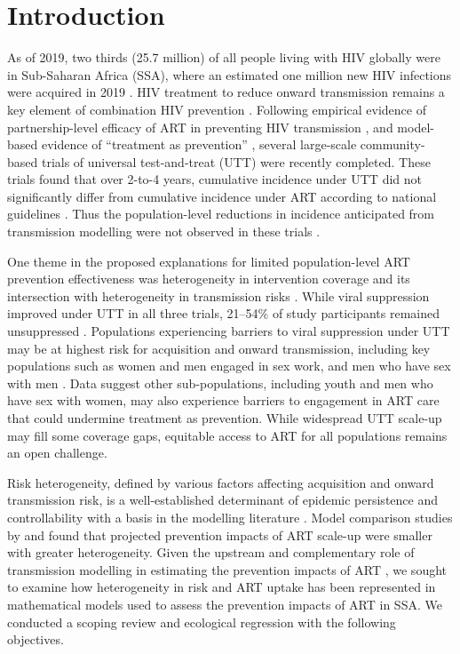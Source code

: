 \section{Introduction}
\label{s:intro}
As of 2019, two thirds (25.7 million) of all people living with HIV globally
were in Sub-Saharan Africa (SSA), where
an estimated one million new HIV infections were acquired in 2019 \cite{AIDSinfo}.
HIV treatment to reduce onward transmission remains a key element of combination HIV prevention \cite{WHO2016ART}.
Following empirical evidence of partnership-level efficacy of ART
in preventing HIV transmission \cite{Lundgren2015,Danel2015,Cohen2016},
and model-based evidence of ``treatment as prevention'' \cite{Granich2009,Eaton2012,Cori2014},
several large-scale community-based trials of universal test-and-treat (UTT) were recently completed.
These trials found that over 2-to-4 years,
cumulative incidence under UTT did not significantly differ from
cumulative incidence under ART according to national guidelines \cite{Havlir2019,Hayes2019,Iwuji2018}.
Thus the population-level reductions in incidence anticipated from transmission modelling
were not observed in these trials \cite{Baral2019,Havlir2020}.
\par
One theme in the proposed explanations for limited population-level ART prevention effectiveness
was heterogeneity in intervention coverage and its intersection with
heterogeneity in transmission risks \cite{AbdoolKarim2019,Baral2019}.
While viral suppression improved under UTT in all three trials,
21--54\% of study participants remained unsuppressed \cite{Iwuji2018,Havlir2019,Hayes2019}.
Populations experiencing barriers to viral suppression under UTT
may be at highest risk for acquisition and onward transmission, including key populations such as
women and men engaged in sex work, and men who have sex with men \cite{Hakim2018,Nyato2019}.
Data suggest other sub-populations, including youth and men who have sex with women, may also
experience barriers to engagement in ART care \cite{Green2020,Quinn2019}
that could undermine treatment as prevention.
While widespread UTT scale-up may fill some coverage gaps,
equitable access to ART for all populations remains an open challenge.
\par
Risk heterogeneity, defined by various factors affecting acquisition and onward transmission risk,
is a well-established determinant of epidemic persistence and controllability
with a basis in the modelling literature \cite{Anderson1986,Boily1997}.
Model comparison studies by \citet{Hontelez2013} and \citet{Rozhnova2016}
found that projected prevention impacts of ART scale-up were smaller with greater heterogeneity.
Given the upstream and complementary role of transmission modelling
in estimating the prevention impacts of ART \cite{Eaton2012,Delva2012},
we sought to examine how heterogeneity in risk and ART uptake has been represented
in mathematical models used to assess the prevention impacts of ART in SSA.
We conducted a scoping review and ecological regression with the following objectives.

